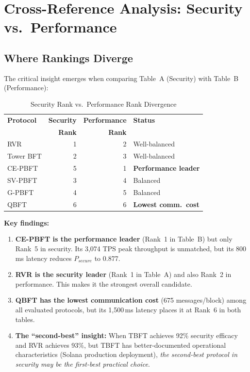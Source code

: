 \documentclass[10pt,twocolumn,letterpaper]{article}
\begin{document}
\section{Cross-Reference Analysis: Security vs.\ Performance}
\label{sec:crossref}

\subsection{Where Rankings Diverge}

The critical insight emerges when comparing Table~A (Security) with Table~B (Performance):

\begin{table}[htbp]
\caption{Security Rank vs.\ Performance Rank Divergence}
\label{tab:divergence}
\centering
\scriptsize
\begin{tabular}{@{}lrrl@{}}
\toprule
\textbf{Protocol} & \textbf{Security} & \textbf{Performance} & \textbf{Status} \\
 & \textbf{Rank} & \textbf{Rank} & \\
\midrule
RVR & 1 & 2 & Well-balanced \\
Tower BFT & 2 & 3 & Well-balanced \\
CE-PBFT & 5 & 1 & \textbf{Performance leader} \\
SV-PBFT & 3 & 4 & Balanced \\
G-PBFT & 4 & 5 & Balanced \\
QBFT & 6 & 6 & \textbf{Lowest comm.\ cost} \\
\bottomrule
\end{tabular}
\end{table}

\textbf{Key findings:}
\begin{enumerate}[leftmargin=*]
    \item \textbf{CE-PBFT is the performance leader} (Rank~1 in Table~B) but only Rank~5 in security. Its 3,074 TPS peak throughput is unmatched, but its 800\,ms latency reduces $P_{secure}$ to 0.877.

    \item \textbf{RVR is the security leader} (Rank~1 in Table~A) and also Rank~2 in performance. This makes it the strongest overall candidate.

    \item \textbf{QBFT has the lowest communication cost} (675 messages/block) among all evaluated protocols, but its 1,500\,ms latency places it at Rank~6 in both tables.

    \item \textbf{The ``second-best'' insight:} When TBFT achieves 92\% security efficacy and RVR achieves 93\%, but TBFT has better-documented operational characteristics (Solana production deployment), \emph{the second-best protocol in security may be the first-best practical choice}.
\end{enumerate}
\end{document}
